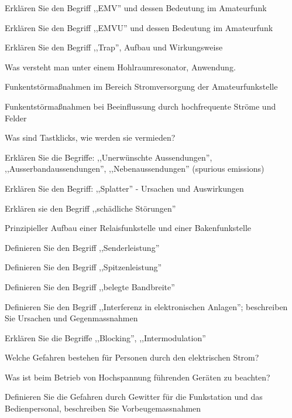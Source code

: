 \documentclass[avery5371,grid,frame,a4paper]{flashcards}
\newcommand\question[2]{
  \begin{flashcard}[{\chap} -- #1]{#2}\end{flashcard}
}
\newcommand\class[1]{{\footnotesize [Klassen: #1]}}
\begin{document}
\question{87}{Erklären Sie den Begriff ,,EMV'' und dessen Bedeutung im Amateurfunk}
\question{88}{Erklären Sie den Begriff ,,EMVU'' und dessen Bedeutung im Amateurfunk}
\question{89}{Erklären Sie den Begriff ,,Trap'', Aufbau und Wirkungsweise}
\question{90}{Was versteht man unter einem Hohlraumresonator, Anwendung.}
\question{91}{Funkentstörmaßnahmen im Bereich Stromversorgung der Amateurfunkstelle}
\question{92}{Funkentstörmaßnahmen bei Beeinflussung durch hochfrequente Ströme und Felder}
\question{93}{Was sind Tastklicks, wie werden sie vermieden?}
\question{94}{Erklären Sie die Begriffe: ,,Unerwünschte Aussendungen'', ,,Ausserbandaussendungen'', ,,Nebenaussendungen'' (spurious emissions)}
\question{95}{Erklären Sie den Begriff: ,,Splatter'' - Ursachen und Auswirkungen}
\question{96}{Erklären sie den Begriff ,,schädliche Störungen''}
\question{97}{Prinzipieller Aufbau einer Relaisfunkstelle und einer Bakenfunkstelle}
\question{98}{Definieren Sie den Begriff ,,Senderleistung''}
\question{99}{Definieren Sie den Begriff ,,Spitzenleistung''}
\question{100}{Definieren Sie den Begriff ,,belegte Bandbreite''}
\question{101}{Definieren Sie den Begriff ,,Interferenz in elektronischen Anlagen''; beschreiben Sie Ursachen und Gegenmassnahmen}
\question{102}{Erklären Sie die Begriffe ,,Blocking'', ,,Intermodulation''}
\question{103}{Welche Gefahren bestehen für Personen durch den elektrischen Strom?}
\question{104}{Was ist beim Betrieb von Hochspannung führenden Geräten zu beachten?}
\question{105}{Definieren Sie die Gefahren durch Gewitter für die Funkstation und das Bedienpersonal, beschreiben Sie Vorbeugemassnahmen}

\def\chap{Technische Grundlagen \class{3,4}}
\end{document}
